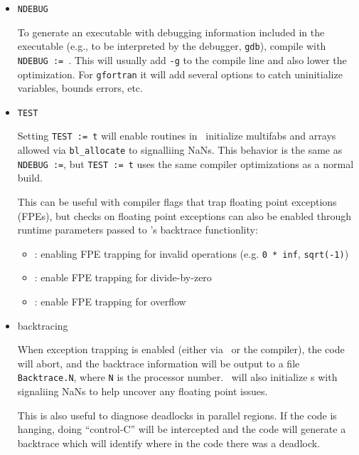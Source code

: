 \begin{itemize}

\item {\tt NDEBUG} 

   To generate an executable
  with debugging information included in the executable (e.g., to be
  interpreted by the debugger, {\tt gdb}), compile with {\tt NDEBUG
    :=\ }.  This will usually add {\tt -g} to the compile line and
  also lower the optimization.  For {\tt gfortran} it will add several
  options to catch uninitialize variables, bounds errors, etc.


\item {\tt TEST}

  Setting {\tt TEST := t} will
  enable routines in \fboxlib\ initialize multifabs and arrays 
  allowed via {\tt bl\_allocate} to signalliing NaNs.  This behavior
  is the same as {\tt NDEBUG :=}, but {\tt TEST := t} uses the 
  same compiler optimizations as a normal build.  

  This can be useful with compiler flags that trap floating point
  exceptions (FPEs), but checks on floating point exceptions can also
  be enabled through runtime parameters passed to \fboxlib's
  backtrace functionlity:
  \begin{itemize}
  \item {}: enabling FPE trapping for
    invalid operations (e.g. {\tt 0 * inf}, {\tt sqrt(-1)})

  \item {}: enable FPE trapping for
    divide-by-zero

  \item {}: enable FPE trapping for
    overflow
  \end{itemize}

\item backtracing

  When exception trapping is enabled (either via \fboxlib\ or the
  compiler), the code will abort, and the backtrace information will
  be output to a file {\tt Backtrace.N}, where {\tt N} is the
  processor number.  \fboxlib\ will also initialize \multifab s with
  signaliing NaNs to help uncover any floating point issues.

  This is also useful to diagnose deadlocks in parallel regions.
  If the code is hanging, doing ``control-C'' will be intercepted
  and the code will generate a backtrace which will identify
  where in the code there was a deadlock.


\end{itemize}
